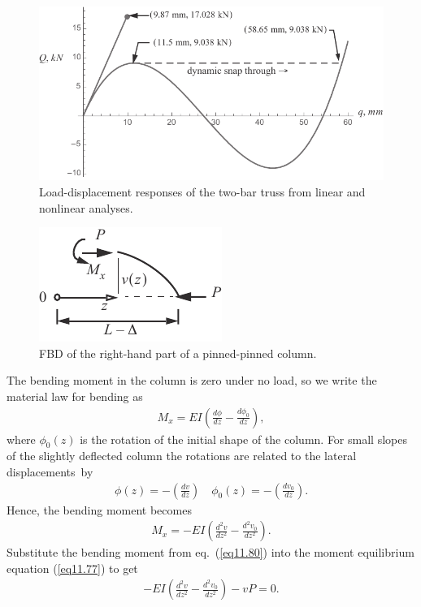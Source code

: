 \documentclass{AeroStructure-ERJohnson}
\begin{document}
\begin{figure}[!t]
\centerline{\includegraphics{Figure_11-12.pdf}}
\caption{Load-displacement responses of the two-bar truss from linear and nonlinear analyses.} \label{fig11.12}
\vspace{-6pt}
\end{figure}

\begin{figure}
\vspace{-19pt}
\includegraphics{Figure_11-13.pdf}
\caption{FBD of the right-hand part of a pinned-pinned column.\label{fig11.13}}
\end{figure}

\vspace*{-1pc}

\noindent The bending moment in the column is zero under no load, so we write the material law for bending as\vspace*{-6pt}
\begin{align}\label{eq11.78}
M_{x}=E I\left(\frac{d \phi}{d z}-\frac{d \phi_{0}}{d z}\right),
\end{align}
where $\phi_{0}(z)$ is the rotation of the initial shape of the column. For small slopes of the slightly deflected column the rotations are related to the lateral displacements~by
\begin{align}
\phi(z)=-\left(\frac{d v}{d z}\right) \quad \phi_{0}(z)=-\left(\frac{d v_{0}}{d z}\right). \label{eq11.79}
\end{align}
Hence, the bending moment becomes
\begin{align}\label{eq11.80}
M_{x}=-E I\left(\frac{d^{2} v}{d z^{2}}-\frac{d^{2} v_{0}}{d z^{2}}\right).
\end{align}
Substitute the bending moment from eq.~(\ref{eq11.80}) into the moment equilibrium equation (\ref{eq11.77}) to get
\begin{align}\label{eq11.81}
-E I\left(\frac{d^{2} v}{d z^{2}}-\frac{d^{2} v_{0}}{d z^{2}}\right)-v P=0.
\end{align}
\end{document}
